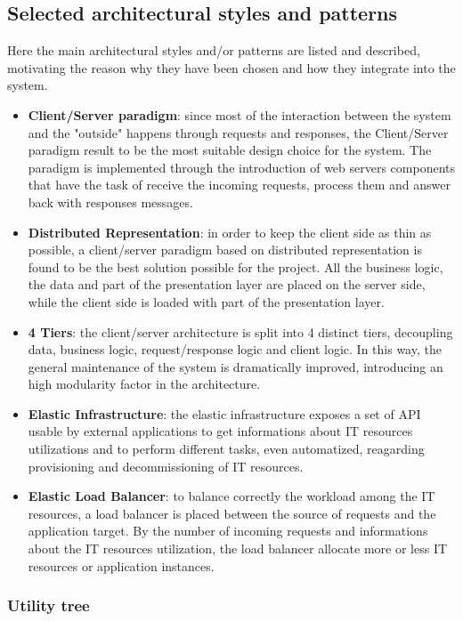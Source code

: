\subsection{Selected architectural styles and patterns}

\label{sec:selected-styles-patterns}

Here the main architectural styles and/or patterns are listed and described, motivating the reason why they have been chosen and how they integrate into the system.

\begin{itemize}	
	\item \textbf{Client/Server paradigm}: since most of the interaction between the system and the "outside" happens through requests and responses, the Client/Server paradigm result to be the most suitable design choice for the system.
The paradigm is implemented through the introduction of web servers components that have the task of receive the incoming requests, process them and answer back with responses messages.
	\item \textbf{Distributed Representation}: in order to keep the client side as thin as possible, a client/server paradigm based on distributed representation is found to be the best solution possible for the project. All the business logic, the data and part of the presentation layer are placed on the server side, while the client side is loaded with part of the presentation layer.
	\item \textbf{4 Tiers}: the client/server architecture is split into 4 distinct tiers, decoupling data, business logic, request/response logic and client logic. In this way, the general maintenance of the system is dramatically improved, introducing an high modularity factor in the architecture.
	\item \textbf{Elastic Infrastructure}: the elastic infrastructure exposes a set of API usable by external applications to get informations about IT resources utilizations and to perform different tasks, even automatized, reagarding provisioning and decommissioning of IT resources.
	\item \textbf{Elastic Load Balancer}: to balance correctly the workload among the IT resources, a load balancer is placed between the source of requests and the application target. By the number of incoming requests and informations about the IT resources utilization, the load balancer allocate more or less IT resources or application instances. 
\end{itemize}

	\subsubsection{Utility tree}
